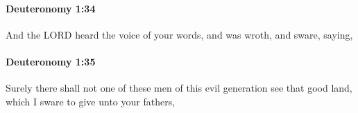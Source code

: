 		\paragraph{Deuteronomy 1:34} %
			\label{DEUTERONOMY-1-34}

			And the LORD heard the voice of your words, and was wroth, and sware, saying,


		\paragraph{Deuteronomy 1:35} %
			\label{DEUTERONOMY-1-35}

			Surely there shall not one of these men of this evil generation see that good land, which I sware to give unto your fathers,


